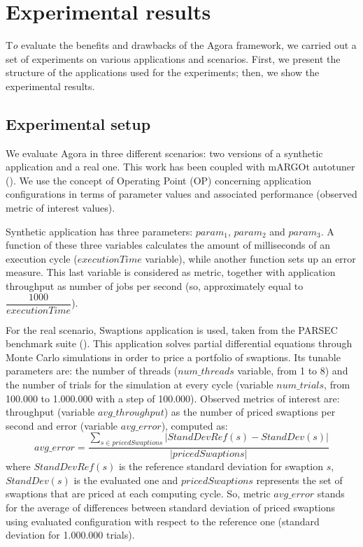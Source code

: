 \chapter{Experimental results}\label{exps}

\lettrine{T}{}\textit{o} evaluate the benefits and drawbacks of the Agora framework, we carried out a set of experiments on various applications and scenarios. First, we present the structure of the applications used for the experiments; then, we show the experimental results.

\section{Experimental setup}\label{expSetup}

We evaluate Agora in three different scenarios: two versions of a synthetic application and a real one. This work has been coupled with mARGOt autotuner (\cite{gadioli2015application}). We use the concept of Operating Point (OP) concerning application configurations in terms of parameter values and associated performance (observed metric of interest values).

Synthetic application has three parameters: $param_1$, $param_2$ and $param_3$. A function of these three variables calculates the amount of milliseconds of an execution cycle ($executionTime$ variable), while another function sets up an error measure. This last variable is considered as metric, together with application throughput as number of jobs per second (so, approximately equal to $\dfrac{1000}{executionTime}$).

\vspace*{2mm}

For the real scenario, Swaptions application is used, taken from the PARSEC benchmark suite (\cite{bienia2008parsec}). This application solves partial differential equations through Monte Carlo simulations in order to price a portfolio of swaptions. Its tunable parameters are: the number of threads ($num\_threads$ variable, from 1 to 8) and the number of trials for the simulation at every cycle (variable $num\_trials$, from 100.000 to 1.000.000 with a step of 100.000). Observed metrics of interest are: throughput (variable $avg\_throughput$) as the number of priced swaptions per second and error (variable $avg\_error$), computed as:
\[
avg\_error = \dfrac{\sum_{s \in pricedSwaptions} \left\vert StandDevRef(s) - StandDev(s) \right\vert}{\left\vert pricedSwaptions \right\vert}
\]
where $StandDevRef(s)$ is the reference standard deviation for swaption $s$, $StandDev(s)$ is the evaluated one and $pricedSwaptions$ represents the set of swaptions that are priced at each computing cycle. So, metric $avg\_error$ stands for the average of differences between standard deviation of priced swaptions using evaluated configuration with respect to the reference one (standard deviation for 1.000.000 trials).

